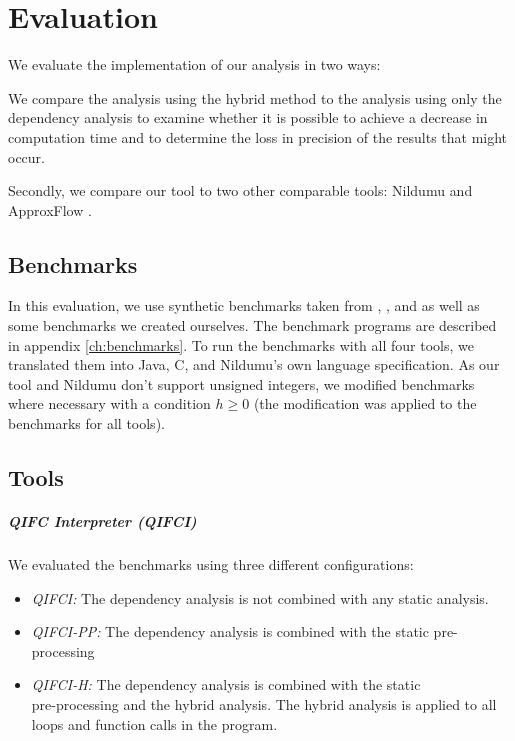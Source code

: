 \chapter{Evaluation}\label{sec:eval}
We evaluate the implementation of our analysis in two ways:

We compare the analysis using the hybrid method to the analysis using only the dependency analysis to examine whether it is possible to achieve a decrease in computation time and to determine the loss in precision of the results that might occur.

Secondly, we compare our tool to two other comparable tools: Nildumu \cite{bechberger18} and ApproxFlow \cite{biondi18}.

\section{Benchmarks}
In this evaluation, we use synthetic benchmarks taken from \cite{backes09}, \cite{bechberger18}, \cite{biondi15} and \cite{meng11} as well as some benchmarks we created ourselves. The benchmark programs are described in appendix \ref{ch:benchmarks}. To run the benchmarks with all four tools, we translated them into Java, C, and Nildumu's own language specification. As our tool and Nildumu don't support unsigned integers, we modified benchmarks where necessary with a condition $h \geq 0$ (the modification was applied to the benchmarks for all tools).

\section{Tools}

\paragraph{QIFC Interpreter (QIFCI)}
We evaluated the benchmarks using three different configurations:
\begin{itemize}
    \item \emph{QIFCI:} The dependency analysis is not combined with any static analysis.
    \item \emph{QIFCI-PP:} The dependency analysis is combined with the static pre-processing
    \item \emph{QIFCI-H:} The dependency analysis is combined with the static \\ pre-processing and the hybrid analysis. The hybrid analysis is applied to all loops and function calls in the program.
\end{itemize}

